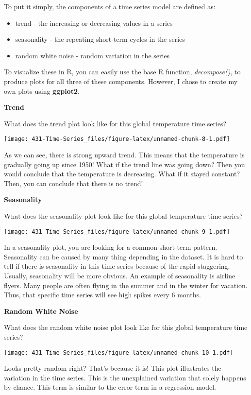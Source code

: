 \documentclass[
]{book}
\providecommand{\tightlist}{%
  \setlength{\itemsep}{0pt}\setlength{\parskip}{0pt}}
\begin{document}
To put it simply, the components of a time series model are defined as:

\begin{itemize}
\tightlist
\item
  trend - the increasing or decreasing values in a series
\item
  seasonality - the repeating short-term cycles in the series
\item
  random white noise - random variation in the series
\end{itemize}

To visualize these in R, you can easily use the base R function, \emph{decompose()}, to produce plots for all three of these components. However, I chose to create my own plots using \textbf{ggplot2}.

\textbf{Trend}

What does the trend plot look like for this global temperature time series?

\texttt{[image: 431-Time-Series\_files/figure-latex/unnamed-chunk-8-1.pdf]}

As we can see, there is strong upward trend. This means that the temperature is gradually going up since 1950! What if the trend line was going down? Then you would conclude that the temperature is decreasing. What if it stayed constant? Then, you can conclude that there is no trend!

\textbf{Seasonality}

What does the seasonality plot look like for this global temperature time series?

\texttt{[image: 431-Time-Series\_files/figure-latex/unnamed-chunk-9-1.pdf]}

In a seasonality plot, you are looking for a common short-term pattern. Seasonality can be caused by many thing depending in the dataset. It is hard to tell if there is seasonality in this time series because of the rapid staggering. Usually, seasonality will be more obvious. An example of seasonality is airline flyers. Many people are often flying in the summer and in the winter for vacation. Thus, that specific time series will see high spikes every 6 months.

\textbf{Random White Noise}

What does the random white noise plot look like for this global temperature time series?

\texttt{[image: 431-Time-Series\_files/figure-latex/unnamed-chunk-10-1.pdf]}

Looks pretty random right? That's because it is! This plot illustrates the variation in the time series. This is the unexplained variation that solely happens by chance. This term is similar to the error term in a regression model.
\end{document}
